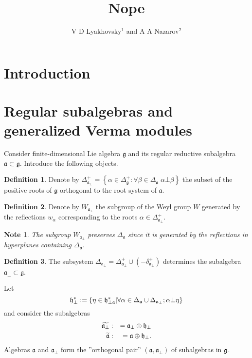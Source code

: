 \documentclass[12pt]{article}
\newtheorem{mynote}{Note}[section]
\theoremstyle{definition}
\newtheorem{definition}{Definition}
\newcommand{\af}{\mathfrak{a}}
\newcommand{\afb}{\mathfrak{a}_{\bot}}
\begin{document}
\title{Nope}
\author{V D Lyakhovsky$^1$ and A A Nazarov$^2$}

\begin{abstract}
\end{abstract}

\section{Introduction}
\label{sec:introduction}

\section{Regular subalgebras and generalized Verma modules}
\label{sec:regul-subalg-gener}

Consider finite-dimensional Lie algebra $\mathfrak{g}$  and its regular reductive subalgebra $\af\subset \mathfrak{g}$. Introduce the following objects.
\begin{definition}
  \label{def-1}
  Denote by $\Delta^{+}_{\afb}=\left\{\alpha\in \Delta^{+}_{\mathfrak{g}}:\forall \beta\in\Delta_{\af} \; \alpha\bot \beta\right\}$ the subset of the positive roots of $\mathfrak{g}$ orthogonal to the root system of $\af$.
\end{definition}

\begin{definition}
  \label{def-2}
  Denote by $W_{\afb}$ the subgroup of the Weyl group $W$ generated by the reflections $w_{\alpha}$ corresponding to the roots $\alpha\in \Delta^{+}_{\afb}$.
\end{definition}
\begin{mynote}
  The subgroup $W_{\afb}$ preserves $\Delta_{\af}$ since it is generated by the reflections in hyperplanes containing $\Delta_{\af}$.
\end{mynote}
\begin{definition}
  \label{def-3}
  The subsystem $\Delta_{\afb}=\Delta^{+}_{\afb}\cup \left(-\delta^{+}_{\afb}\right)$ determines the subalgebra $\af_{\bot}\subset \mathfrak{g}$.
\end{definition}
Let
\begin{equation*}
\frak{h}_{\perp }^{\ast }:=\left\{ \eta \in \frak{h}_{\perp \af}^{\ast
}|\forall \alpha \in \Delta _{\af}\cup \Delta _{\af_{\perp
}};\alpha \bot \eta \right\}
\end{equation*}
and consider the subalgebras
\begin{eqnarray*}
\widetilde{\af_{\perp }} &:&=\af_{\perp }\oplus \frak{h}_{\perp }
\\
\widetilde{\af} &:&=\af\oplus \frak{h}_{\perp }.
\end{eqnarray*}
Algebras $\af$ and $\af_{\perp }$ form the ''orthogonal pair''
$\left( \af,\af_{\perp}\right) $
of subalgebras in $\frak{g}$.
\end{document}
